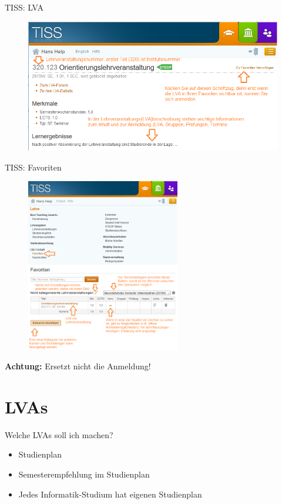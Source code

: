 \documentclass{beamer}
\begin{document}
\begin{frame}{TISS: LVA}
    \begin{figure}[htp]
        \centering
        \includegraphics[width=1\textwidth]{tiss_lva.png}
    \end{figure}
\end{frame}

\begin{frame}{TISS: Favoriten}
    \begin{figure}[htp]
        \centering
        \includegraphics[width=0.6\textwidth]{tiss_favoriten.png}
    \end{figure}
    \centering \textbf{Achtung:} Ersetzt nicht die Anmeldung!
\end{frame}

\section{LVAs}

\begin{frame}{Welche LVAs soll ich machen?}
    \begin{itemize}
        \item Studienplan
        \item Semesterempfehlung im Studienplan
        \item Jedes Informatik-Studium hat eigenen Studienplan
    \end{itemize}
\end{frame}
\end{document}
